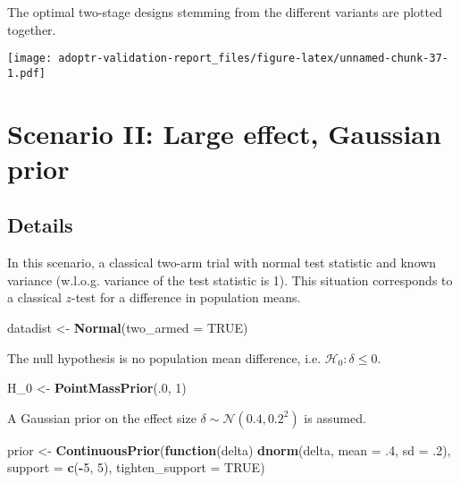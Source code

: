 \documentclass[]{book}
\newenvironment{Shaded}{\begin{snugshade}}{\end{snugshade}}
\newcommand{\ControlFlowTok}[1]{\textcolor[rgb]{0.13,0.29,0.53}{\textbf{#1}}}
\newcommand{\DataTypeTok}[1]{\textcolor[rgb]{0.13,0.29,0.53}{#1}}
\newcommand{\DecValTok}[1]{\textcolor[rgb]{0.00,0.00,0.81}{#1}}
\newcommand{\FloatTok}[1]{\textcolor[rgb]{0.00,0.00,0.81}{#1}}
\newcommand{\KeywordTok}[1]{\textcolor[rgb]{0.13,0.29,0.53}{\textbf{#1}}}
\newcommand{\NormalTok}[1]{#1}
\newcommand{\OperatorTok}[1]{\textcolor[rgb]{0.81,0.36,0.00}{\textbf{#1}}}
\newcommand{\OtherTok}[1]{\textcolor[rgb]{0.56,0.35,0.01}{#1}}
\newcommand{\StringTok}[1]{\textcolor[rgb]{0.31,0.60,0.02}{#1}}
\begin{document}
The optimal two-stage designs stemming from the different variants
are plotted together.

\texttt{[image: adoptr-validation-report\_files/figure-latex/unnamed-chunk-37-1.pdf]}

\hypertarget{scenarioII}{%
\chapter{Scenario II: Large effect, Gaussian prior}\label{scenarioII}}

\hypertarget{details-1}{%
\section{Details}\label{details-1}}

In this scenario, a classical two-arm trial with normal
test statistic and known variance (w.l.o.g. variance of
the test statistic is 1).
This situation corresponds to a classical \(z\)-test for
a difference in population means.

\begin{Shaded}
\begin{Highlighting}[]
\NormalTok{datadist <-}\StringTok{ }\KeywordTok{Normal}\NormalTok{(}\DataTypeTok{two_armed =} \OtherTok{TRUE}\NormalTok{)}
\end{Highlighting}
\end{Shaded}

The null hypothesis is no population mean difference, i.e.
\(\mathcal{H}_0:\delta \leq 0\).

\begin{Shaded}
\begin{Highlighting}[]
\NormalTok{H_}\DecValTok{0}\NormalTok{ <-}\StringTok{ }\KeywordTok{PointMassPrior}\NormalTok{(.}\DecValTok{0}\NormalTok{, }\DecValTok{1}\NormalTok{)}
\end{Highlighting}
\end{Shaded}

A Gaussian prior on the effect size
\(\delta \sim \mathcal{N} ( 0.4, 0.2^2)\) is assumed.

\begin{Shaded}
\begin{Highlighting}[]
\NormalTok{prior <-}\StringTok{ }\KeywordTok{ContinuousPrior}\NormalTok{(}\ControlFlowTok{function}\NormalTok{(delta) }\KeywordTok{dnorm}\NormalTok{(delta, }\DataTypeTok{mean =} \FloatTok{.4}\NormalTok{, }\DataTypeTok{sd =} \FloatTok{.2}\NormalTok{),}
                         \DataTypeTok{support =} \KeywordTok{c}\NormalTok{(}\OperatorTok{-}\DecValTok{5}\NormalTok{, }\DecValTok{5}\NormalTok{),}
                         \DataTypeTok{tighten_support =} \OtherTok{TRUE}\NormalTok{)}
\end{Highlighting}
\end{Shaded}
\end{document}
